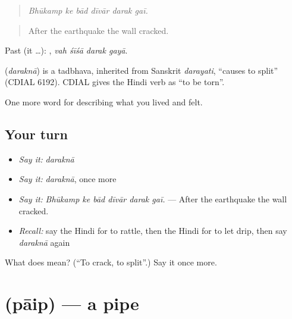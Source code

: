 \begin{quote}
     
\end{quote}

\begin{quote}
\emph{Bhūkamp ke bād dīvār darak gaī.}
\end{quote}

\begin{quote}
After the earthquake the wall cracked.
\end{quote}

Past (it …):    , \emph{vah śīśā darak gayā}.

\begin{cousinweb}
\textbf{} (\emph{daraknā}) is a tadbhava, inherited from Sanskrit \emph{darayati}, \textquotedblleft{}causes to split\textquotedblright{} (CDIAL 6192). CDIAL gives the Hindi verb as \textquotedblleft{}to be torn\textquotedblright{}.
\end{cousinweb}

\begin{grammarlens}[title={What you've built}]
One more word for describing what you lived and felt.
\end{grammarlens}

\subsection*{Your turn}
\begin{itemize}
\raggedright
  \item \emph{Say it:} \emph{daraknā}
  \item \emph{Say it:} \emph{daraknā}, once more
  \item \emph{Say it:} \emph{Bhūkamp ke bād dīvār darak gaī.} — After the earthquake the wall cracked.
  \item \emph{Recall:} say the Hindi for to rattle, then the Hindi for to let drip, then say \emph{daraknā} again
\end{itemize}

\begin{tcolorbox}[breakable,colback=teal!4,colframe=teal!35!black,title={Before you move on}]
What does  mean? (\textquotedblleft{}To crack, to split\textquotedblright{}.) Say it once more.
\end{tcolorbox}
\section[\texorpdfstring{\hi{पाइप} (pāip)}{पाइप (pāip)}]{ (pāip) — a pipe}


